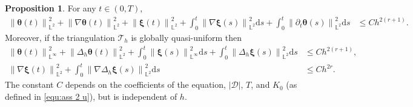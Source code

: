 \documentclass[11pt, reqno]{amsart}
\theoremstyle{definition}
\newtheorem{proposition}[theorem]{Proposition}
\theoremstyle{remark}
\numberwithin{equation}{section}
\newcommand{\bff}{\boldsymbol}
\newcommand{\bb}{\mathbb}
\newcommand{\ds}{\mathrm{d}s}
\newcommand{\norm}[2]{\left\|{#1}\right\|_{#2}}
\newcommand{\abs}[1]{\left|{#1}\right|}
\begin{document}
\begin{proposition}\label{pro:semidisc theta xi}
	For any $t\in (0,T)$,
\begin{align}\label{equ:semidisc theta xi}
	\norm{\bff{\theta}(t)}{\bb{L}^2}^2
	+
	\norm{\nabla \bff{\theta}(t)}{\bb{L}^2}^2
	+
	\norm{\bff{\xi}(t)}{\bb{L}^2}^2
	+
	\int_0^t \norm{\nabla \bff{\xi}(s)}{\bb{L}^2}^2 \ds
	+
	\int_0^t \norm{\partial_t \bff{\theta}(s)}{\bb{L}^2}^2 \ds
	&\leq Ch^{2(r+1)}.
\end{align}
Moreover, if the triangulation $\mathcal{T}_h$ is globally quasi-uniform then
\begin{align}\label{equ:semidisc theta xi infty}
	\norm{\bff{\theta}(t)}{\bb{L}^\infty}^2
	+
	\norm{\Delta_h \bff{\theta}(t)}{\bb{L}^2}^2
	+
	\int_0^t \norm{\bff{\xi}(s)}{\bb{L}^\infty}^2 \ds
	+
	\int_0^t \norm{\Delta_h \bff{\xi}(s)}{\bb{L}^2}^2 \ds
	&\leq 
	Ch^{2(r+1)},
	\\
	\label{equ:semidisc xi L2}
	\norm{\nabla \bff{\xi}(t)}{\bb{L}^2}^2
	+
	\int_0^t \norm{\nabla \Delta_h \bff{\xi}(s)}{\bb{L}^2}^2 \ds 
	&\leq
	Ch^{2r}.
\end{align}
The constant $C$ depends on the coefficients of the equation, $|\mathscr{D}|$, $T$, and $K_0$ (as defined in \eqref{equ:ass 2 u}), but is independent of $h$.
\end{proposition}
\end{document}
